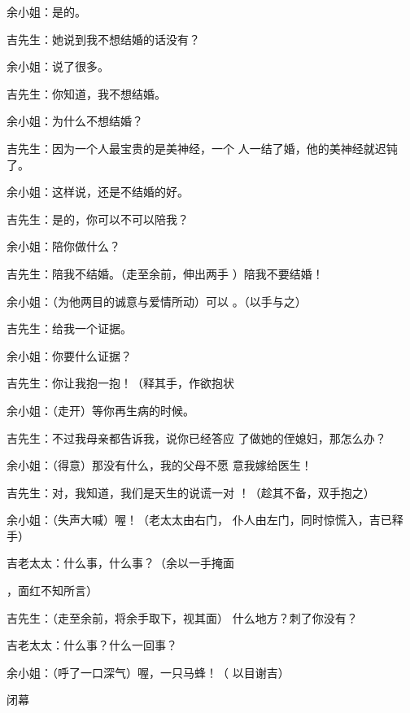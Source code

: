 \documentclass{article}
\begin{document}
余小姐：是的。 


吉先生：她说到我不想结婚的话没有？ 


\newpage

余小姐：说了很多。 


吉先生：你知道，我不想结婚。 


余小姐：为什么不想结婚？ 

吉先生：因为一个人最宝贵的是美神经，一个
人一结了婚，他的美神经就迟钝了。 


余小姐：这样说，还是不结婚的好。 


吉先生：是的，你可以不可以陪我？ 


余小姐：陪你做什么？ 

吉先生：陪我不结婚。（走至余前，伸出两手
）陪我不要结婚！ 

余小姐：（为他两目的诚意与爱情所动）可以
。（以手与之） 


\newpage

吉先生：给我一个证据。 


余小姐：你要什么证据？ 

吉先生：你让我抱一抱！（释其手，作欲抱状


余小姐：（走开）等你再生病的时候。 

吉先生：不过我母亲都告诉我，说你已经答应
了做她的侄媳妇，那怎么办？ 


余小姐：（得意）那没有什么，我的父母不愿
意我嫁给医生！ 

吉先生：对，我知道，我们是天生的说谎一对
！（趁其不备，双手抱之） 

余小姐：（失声大喊）喔！（老太太由右门，
仆人由左门，同时惊慌入，吉已释手） 

吉老太太：什么事，什么事？（余以一手掩面
\newpage

，面红不知所言） 

吉先生：（走至余前，将余手取下，视其面）
什么地方？刺了你没有？ 


吉老太太：什么事？什么一回事？ 

余小姐：（呼了一口深气）喔，一只马蜂！（
以目谢吉） 

闭幕
\end{document}
